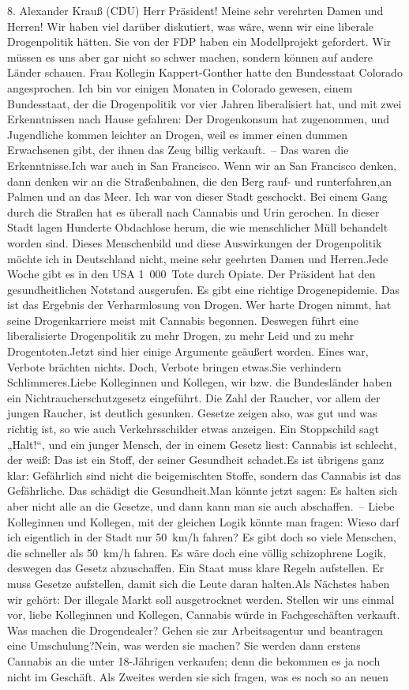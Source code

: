 \documentclass{article}
\begin{document}
	8. Alexander Krauß (CDU) Herr Präsident! Meine sehr verehrten Damen und Herren! Wir haben viel darüber diskutiert, was wäre, wenn wir eine liberale Drogenpolitik hätten. Sie von der FDP haben ein Modellprojekt gefordert. Wir müssen es uns aber gar nicht so schwer machen, sondern können auf andere Länder schauen. Frau Kollegin Kappert-Gonther hatte den Bundesstaat Colorado angesprochen. Ich bin vor einigen Monaten in Colorado gewesen, einem Bundesstaat, der die Drogenpolitik vor vier Jahren liberalisiert hat, und mit zwei Erkenntnissen nach Hause gefahren: Der Drogenkonsum hat zugenommen, und Jugendliche kommen leichter an Drogen, weil es immer einen dummen Erwachsenen gibt, der ihnen das Zeug billig verkauft. – Das waren die Erkenntnisse.Ich war auch in San Francisco. Wenn wir an San Francisco denken, dann denken wir an die Straßenbahnen, die den Berg rauf- und runterfahren,an Palmen und an das Meer. Ich war von dieser Stadt geschockt. Bei einem Gang durch die Straßen hat es überall nach Cannabis und Urin gerochen. In dieser Stadt lagen Hunderte Obdachlose herum, die wie menschlicher Müll behandelt worden sind. Dieses Menschenbild und diese Auswirkungen der Drogenpolitik möchte ich in Deutschland nicht, meine sehr geehrten Damen und Herren.Jede Woche gibt es in den USA 1 000 Tote durch Opiate. Der Präsident hat den gesundheitlichen Notstand ausgerufen. Es gibt eine richtige Drogenepidemie. Das ist das Ergebnis der Verharmlosung von Drogen. Wer harte Drogen nimmt, hat seine Drogenkarriere meist mit Cannabis begonnen. Deswegen führt eine liberalisierte Drogenpolitik zu mehr Drogen, zu mehr Leid und zu mehr Drogentoten.Jetzt sind hier einige Argumente geäußert worden. Eines war, Verbote brächten nichts. Doch, Verbote bringen etwas.Sie verhindern Schlimmeres.Liebe Kolleginnen und Kollegen, wir bzw. die Bundesländer haben ein Nichtraucherschutzgesetz eingeführt. Die Zahl der Raucher, vor allem der jungen Raucher, ist deutlich gesunken. Gesetze zeigen also, was gut und was richtig ist, so wie auch Verkehrsschilder etwas anzeigen. Ein Stoppschild sagt „Halt!“, und ein junger Mensch, der in einem Gesetz liest: Cannabis ist schlecht, der weiß: Das ist ein Stoff, der seiner Gesundheit schadet.Es ist übrigens ganz klar: Gefährlich sind nicht die beigemischten Stoffe, sondern das Cannabis ist das Gefährliche. Das schädigt die Gesundheit.Man könnte jetzt sagen: Es halten sich aber nicht alle an die Gesetze, und dann kann man sie auch abschaffen. – Liebe Kolleginnen und Kollegen, mit der gleichen Logik könnte man fragen: Wieso darf ich eigentlich in der Stadt nur 50 km/h fahren? Es gibt doch so viele Menschen, die schneller als 50 km/h fahren. Es wäre doch eine völlig schizophrene Logik, deswegen das Gesetz abzuschaffen. Ein Staat muss klare Regeln aufstellen. Er muss Gesetze aufstellen, damit sich die Leute daran halten.Als Nächstes haben wir gehört: Der illegale Markt soll ausgetrocknet werden. Stellen wir uns einmal vor, liebe Kolleginnen und Kollegen, Cannabis würde in Fachgeschäften verkauft. Was machen die Drogendealer? Gehen sie zur Arbeitsagentur und beantragen eine Umschulung?Nein, was werden sie machen? Sie werden dann erstens Cannabis an die unter 18-Jährigen verkaufen; denn die bekommen es ja noch nicht im Geschäft. Als Zweites werden sie sich fragen, was es noch so an neuen 
\end{document}
